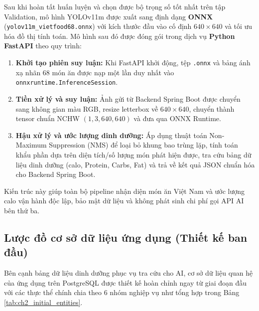 \documentclass[../main.tex]{subfiles}
\begin{document}
Sau khi hoàn tất huấn luyện và chọn được bộ trọng số tốt nhất trên tập Validation, mô hình YOLOv11m được xuất sang định dạng \textbf{ONNX} (\texttt{yolov11m\_vietfood68.onnx}) với kích thước đầu vào cố định $640 \times 640$ và tối ưu hóa đồ thị tính toán. Mô hình sau đó được đóng gói trong dịch vụ \textbf{Python FastAPI} theo quy trình:
\begin{enumerate}
    \item \textbf{Khởi tạo phiên suy luận:} Khi FastAPI khởi động, tệp \texttt{.onnx} và bảng ánh xạ nhãn 68 món ăn được nạp một lần duy nhất vào \texttt{onnxruntime.InferenceSession}.
    \item \textbf{Tiền xử lý và suy luận:} Ảnh gửi từ Backend Spring Boot được chuyển sang không gian màu RGB, resize letterbox về $640 \times 640$, chuyển thành tensor chuẩn NCHW $(1, 3, 640, 640)$ và đưa qua ONNX Runtime.
    \item \textbf{Hậu xử lý và ước lượng dinh dưỡng:} Áp dụng thuật toán Non-Maximum Suppression (NMS) để loại bỏ khung bao trùng lặp, tính toán khẩu phần dựa trên diện tích/số lượng món phát hiện được, tra cứu bảng dữ liệu dinh dưỡng (calo, Protein, Carbs, Fat) và trả về kết quả JSON chuẩn hóa cho Backend Spring Boot.
\end{enumerate}

Kiến trúc này giúp toàn bộ pipeline nhận diện món ăn Việt Nam và ước lượng calo vận hành độc lập, bảo mật dữ liệu và không phát sinh chi phí gọi API AI bên thứ ba.

\subsection{Lược đồ cơ sở dữ liệu ứng dụng (Thiết kế ban đầu)}

Bên cạnh bảng dữ liệu dinh dưỡng phục vụ tra cứu cho AI, cơ sở dữ liệu quan hệ của ứng dụng trên PostgreSQL được thiết kế hoàn chỉnh ngay từ giai đoạn đầu với các thực thể chính chia theo 6 nhóm nghiệp vụ như tổng hợp trong Bảng \ref{tab:ch2_initial_entities}.
\end{document}
